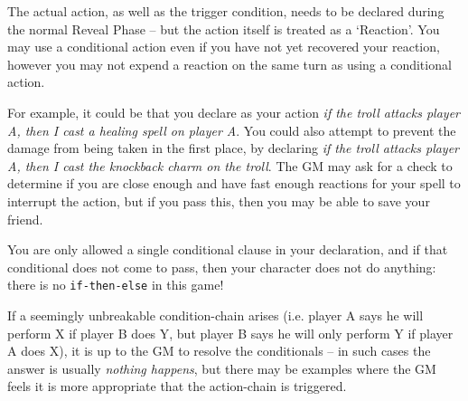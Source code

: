 The actual action, as well as the trigger condition, needs to be declared during the normal Reveal Phase -- but the action itself is treated as a `Reaction'. You may use a conditional action even if you have not yet recovered your reaction, however you may not expend a reaction on the same turn as using a conditional action. 

For example, it could be that you declare as your action \textit{if the troll attacks player A, then I cast a healing spell on player A}. You could also attempt to prevent the damage from being taken in the first place, by declaring \textit{if the troll attacks player A, then I cast the knockback charm on the troll}. The GM may ask for a check to determine if you are close enough and have fast enough reactions for your spell to interrupt the action, but if you pass this, then you may be able to save your friend.

You are only allowed a single conditional clause in your declaration, and if that conditional does not come to pass, then your character does not do anything: there is no \verb|if-then-else| in this game!

If a seemingly unbreakable condition-chain arises (i.e. player A says he will perform X if player B does Y, but player B says he will only perform Y if player A does X), it is up to the GM to resolve the conditionals -- in such cases the answer is usually \textit{nothing happens}, but there may be examples where the GM feels it is more appropriate that the action-chain is triggered. 


